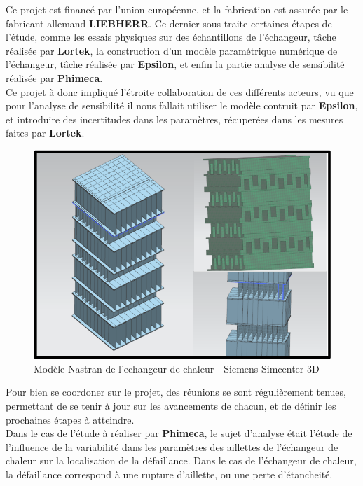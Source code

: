 \documentclass[a4paper,10pt]{article}
\begin{document}
Ce projet est financé par l'union européenne, et la fabrication est assurée par le fabricant allemand \textbf{LIEBHERR}. Ce dernier sous-traite certaines étapes de l'étude, comme les essais physiques sur des échantillons de l'échangeur, tâche réalisée par \textbf{Lortek}, la construction d'un modèle paramétrique numérique de l'échangeur, tâche réalisée par \textbf{Epsilon}, et enfin la partie analyse de sensibilité réalisée par \textbf{Phimeca}. \\

Ce projet à donc impliqué l'étroite collaboration de ces différents acteurs, vu que pour l'analyse de sensibilité il nous fallait utiliser le modèle contruit par \textbf{Epsilon}, et introduire des incertitudes dans les paramètres, récuperées dans les mesures faites par \textbf{Lortek}.


\begin{figure}[H]
   \centering   
   \includegraphics[scale=0.3]{exchangerModel.png}
      \caption{Modèle Nastran de l'echangeur de chaleur - Siemens Simcenter 3D}
         \label{exchangerModel}
\end{figure}

Pour bien se coordoner sur le projet, des réunions se sont régulièrement tenues, permettant de se tenir à jour sur les avancements de chacun, et de définir les prochaines étapes à atteindre. \\ 

Dans le cas de l'étude à réaliser par \textbf{Phimeca}, le sujet d'analyse était l'étude de l'influence de la variabilité dans les paramètres des aillettes de l'échangeur de chaleur sur la localisation de la défaillance. Dans le cas de l'échangeur de chaleur, la défaillance correspond à une rupture d'aillette, ou une perte d'étancheité. \\
\end{document}
